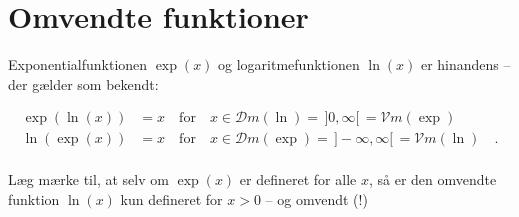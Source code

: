 

\section{Omvendte funktioner} \label{tn14.secOmvendtFunk}

Exponentialfunktionen $\exp(x)$ og logaritmefunktionen $\ln(x)$ er hinandens  -- der gælder som bekendt:

\begin{equation}
\begin{aligned}
\exp(\ln(x)) &= x \quad \textrm{for} \quad x \in \mathcal{D}m(\ln) = \, ]0, \infty[ \,= \mathcal{V}m(\exp)\\
\ln(\exp(x)) & = x \quad \textrm{for} \quad x \in \mathcal{D}m(\exp) =\, ]-\infty, \infty[\, = \mathcal{V}m(\ln) \quad .\\
\end{aligned}
\end{equation}

\begin{think}
Læg mærke til, at selv om $\exp(x)$ er defineret for alle $x$, så er den omvendte funktion $\ln(x)$ kun defineret for $x > 0$ -- og omvendt (!)
\end{think}

